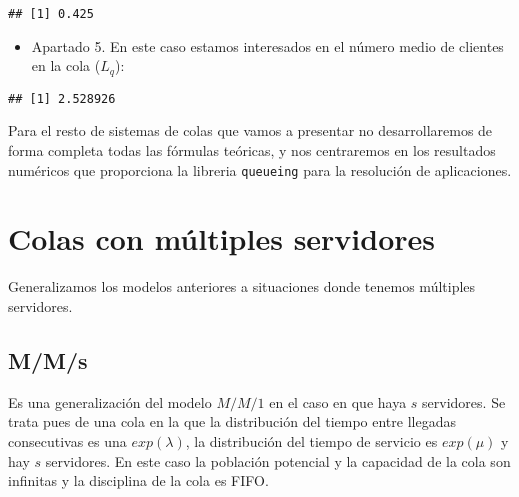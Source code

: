 \documentclass[
]{book}
\newenvironment{Shaded}{\begin{snugshade}}{\end{snugshade}}
\newcommand{\NormalTok}[1]{#1}
\newcommand{\SpecialCharTok}[1]{\textcolor[rgb]{0.00,0.00,0.00}{#1}}
\providecommand{\tightlist}{%
  \setlength{\itemsep}{0pt}\setlength{\parskip}{0pt}}
\newenvironment{bluebox}{
  \definecolor{shadecolor}{rgb}{176, 196, 222}  
  \color{black}
  \begin{shaded}}
 {\end{shaded}}
\theoremstyle{definition}
\theoremstyle{definition}
\theoremstyle{definition}
\theoremstyle{definition}
\theoremstyle{remark}
\begin{document}
\begin{Shaded}
\end{Shaded}

\begin{verbatim}
## [1] 0.425
\end{verbatim}

\begin{itemize}
\tightlist
\item
  Apartado 5. En este caso estamos interesados en el número medio de clientes en la cola (\(L_q\)):
\end{itemize}

\begin{Shaded}
\end{Shaded}

\begin{verbatim}
## [1] 2.528926
\end{verbatim}

\begin{bluebox}
Para el resto de sistemas de colas que vamos a presentar no desarrollaremos de forma completa todas las fórmulas teóricas, y nos centraremos en los resultados numéricos que proporciona la libreria \texttt{queueing} para la resolución de aplicaciones.

\end{bluebox}

\hypertarget{COLASD}{%
\section{Colas con múltiples servidores}\label{COLASD}}

Generalizamos los modelos anteriores a situaciones donde tenemos múltiples servidores.

\hypertarget{mms}{%
\subsection{M/M/s}\label{mms}}

Es una generalización del modelo \(M/M/1\) en el caso en que haya \(s\) servidores. Se trata pues de una cola en la que la distribución del tiempo entre llegadas consecutivas es una \(exp(\lambda)\), la distribución del tiempo de servicio es \(exp(\mu)\) y hay \(s\) servidores. En este caso la población potencial y la capacidad de la cola son infinitas y la disciplina de la cola es FIFO.
\end{document}
